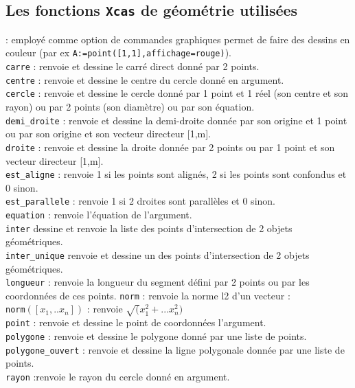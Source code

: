 \documentclass[12pt,a4paper]{book}
\begin{document}
\begin{giacjshere}
\section{Les fonctions {\tt Xcas} de g\'eom\'etrie utilis\'ees}
 : employ\'e comme option de commandes graphiques permet
 de faire des dessins en couleur (par ex 
{\tt A:=point([1,1],affichage=rouge)}).\\
{\tt carre} : renvoie et dessine le carr\'e direct donn\'e par 2 
points.\\
{\tt centre} : renvoie et dessine le centre du cercle donn\'e en argument.\\
{\tt cercle} : renvoie et dessine le cercle donn\'e par 1 point et 1 r\'eel (son
 centre et son rayon) ou par 2 points (son diam\`etre) ou par son \'equation.\\
{\tt demi\_droite} : renvoie et dessine la demi-droite donn\'ee par son origine
 et 1 point ou par son origine et son vecteur directeur [1,m].\\
{\tt droite} : renvoie et dessine la droite donn\'ee par 2 points ou par 1 point
 et son vecteur directeur [1,m].\\
{\tt est\_aligne} : renvoie 1 si les points sont align\'es, 2 si les points sont
 confondus et 0 sinon.\\
{\tt est\_parallele} : renvoie 1 si 2 droites sont parall\`eles et 0 sinon.\\
{\tt equation} : renvoie l'\'equation de l'argument.\\
{\tt inter} dessine et renvoie la liste des points d'intersection de 2 objets g\'eom\'etriques.\\
{\tt inter\_unique} renvoie et dessine un des points d'intersection de 2 objets g\'eom\'etriques.\\
{\tt longueur} : renvoie la longueur du segment d\'efini par 2 points 
ou par les coordonn\'ees de ces points.
{\tt norm} : renvoie la norme l2 d'un vecteur :\\
{\tt norm}$([x_1,..x_n])$ : renvoie $\sqrt(x_1^2+...x_n^2)$\\
{\tt point}  : renvoie et dessine le point de coordonn\'ees l'argument.\\
{\tt polygone} : renvoie et dessine le polygone donn\'e par une liste de 
points.\\
{\tt polygone\_ouvert} : renvoie et dessine la ligne polygonale donn\'ee par une
 liste de points.\\
{\tt rayon} :renvoie le rayon du cercle donn\'e en argument.\\

\end{giacjshere}
\end{document}
